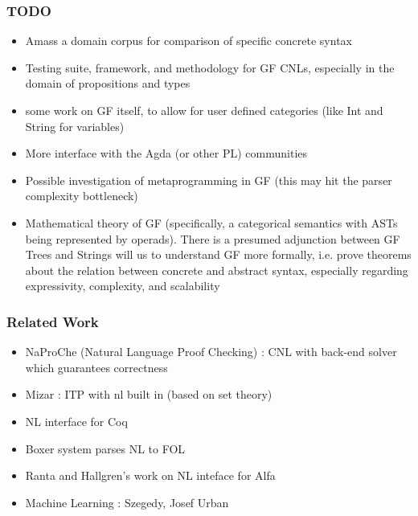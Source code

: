 \documentclass[9pt]{beamer}
\begin{document}
\begin {frame}
\frametitle{TODO}
\begin{itemize}
\item Amass a domain corpus for comparison of specific concrete syntax 
\item Testing suite, framework, and methodology for GF CNLs, especially 
  in the domain of propositions and types 
\item some work on GF itself, to allow for user defined categories (like Int and
String for variables)
\item More interface with the Agda (or other PL) communities
\item Possible investigation of metaprogramming in GF (this may hit the parser
complexity bottleneck)
\item Mathematical theory of GF (specifically, a categorical semantics with ASTs
  being represented by operads). There is a presumed adjunction between GF Trees and Strings will us to understand GF more formally, i.e. prove
  theorems about the relation between concrete and abstract syntax, especially regarding
  expressivity, complexity, and scalability
\end{itemize}
\end{frame}

\begin{frame}
\frametitle{Related Work}
\begin{itemize}
\item NaProChe (Natural Language Proof Checking) : CNL with back-end solver which guarantees correctness
\item Mizar : ITP with nl built in (based on set theory)
\item NL interface for Coq
\item Boxer system parses NL to FOL
\item Ranta and Hallgren's work on NL inteface for Alfa
\item Machine Learning : Szegedy, Josef Urban 
\end{itemize}
\end{frame}
\end{document}
